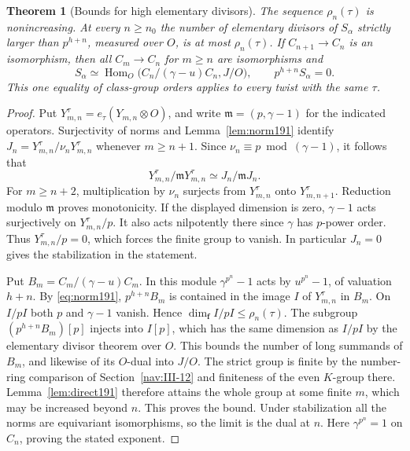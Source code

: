 \documentclass[a4paper,11pt]{article}
\newtheorem{theorem}[proposition]{Theorem}
\theoremstyle{definition}
\theoremstyle{remark}
\numberwithin{equation}{section}
\begin{document}
\begin{theorem}[Bounds for high elementary divisors]\label{thm:tower191}
The sequence \(\rho_n(\tau)\) is nonincreasing. At every
\(n\ge n_0\) the number of elementary divisors of \(S_\alpha\)
strictly larger than \(p^{h+n}\), measured over \(O\), is at
most \(\rho_n(\tau)\). If \(C_{n+1}\to C_n\) is an isomorphism,
then all \(C_m\to C_n\) for \(m\ge n\) are isomorphisms and
\begin{equation}
     S_\alpha\simeq\operatorname{Hom}_O
               \big(C_n/(\gamma-u)C_n,J/O\big),
     \qquad p^{h+n} S_\alpha=0 .
 \label{eq:stable191}
\end{equation}
This one equality of class-group orders applies to every twist
with the same \(\tau\).
\end{theorem}
\begin{proof}
Put \(Y^\tau_{m,n}=e_\tau(Y_{m,n}\otimes O)\), and write
\(\mathfrak m=(p,\gamma-1)\) for the indicated operators.
Surjectivity of norms and Lemma~\ref{lem:norm191} identify
\(J_n=Y^\tau_{m,n}/\nu_nY^\tau_{m,n}\) whenever \(m\ge n+1\).
Since \(\nu_n\equiv p\bmod(\gamma-1)\), it follows that
\[
       Y^\tau_{m,n}/\mathfrak mY^\tau_{m,n}
                      \simeq J_n/\mathfrak m J_n .
\]
For \(m\ge n+2\), multiplication by \(\nu_n\) surjects from
\(Y^\tau_{m,n}\) onto \(Y^\tau_{m,n+1}\). Reduction modulo
\(\mathfrak m\) proves monotonicity. If the displayed dimension is
zero, \(\gamma-1\) acts surjectively on \(Y^\tau_{m,n}/p\).
It also acts nilpotently there since \(\gamma\) has \(p\)-power
order. Thus \(Y^\tau_{m,n}/p=0\), which forces the finite group to vanish.
In particular \(J_n=0\) gives the stabilization in the statement.

Put \(B_m=C_m/(\gamma-u)C_m\). In this module
\(\gamma^{p^n}-1\) acts by \(u^{p^n}-1\), of valuation \(h+n\).
By \eqref{eq:norm191}, \(p^{h+n}B_m\) is contained in the image
\(I\) of \(Y^\tau_{m,n}\) in \(B_m\). On \(I/pI\) both \(p\)
and \(\gamma-1\) vanish. Hence \(\dim_{\mathbf f}I/pI\le\rho_n(\tau)\).
The subgroup \((p^{h+n}B_m)[p]\) injects into \(I[p]\), which
has the same dimension as \(I/pI\) by the elementary divisor
theorem over \(O\). This bounds the number of long summands of
\(B_m\), and likewise of its \(O\)-dual into \(J/O\).
The strict group is finite by the number-ring comparison of
Section~\ref{nav:III-12} and finiteness of the even \(K\)-group there.
Lemma~\ref{lem:direct191} therefore attains the whole group at
some finite \(m\), which may be increased beyond \(n\).
This proves the bound. Under stabilization all the norms are
equivariant isomorphisms, so the limit is the dual at \(n\).
Here \(\gamma^{p^n}=1\) on \(C_n\), proving the stated exponent.
\end{proof}
\end{document}
